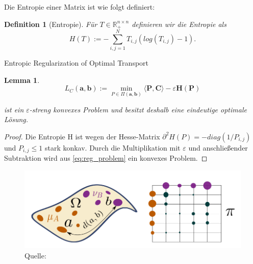 \documentclass[11pt,a4paper]{article}
\newcommand{\source}[1]{\caption*{\hfill Quelle: {#1}} }
\newtheorem{lemma}[theorem]{Lemma}
\newtheorem{definition}[theorem]{Definition}
\numberwithin{equation}{section}
\begin{document}
	Die Entropie einer Matrix ist wie folgt definiert:
	
	\begin{definition}[Entropie]
		Für $T \in \mathbb{R}_{+}^{n \times n}$ definieren wir die Entropie als
		\begin{equation}
		H(T) := - \sum_{i,j=1}^N{T_{i,j}(log(T_{i,j})-1)}.
		\end{equation}
	\end{definition}
	Entropic Regularization of Optimal Transport \cite{computationalOT}
	

	\begin{lemma}
		\begin{equation}
		L_C(\boldsymbol{a}, \boldsymbol{b}):= \min_{P \in \Pi(\boldsymbol{a}, \boldsymbol{b})}{\langle \boldsymbol{P}, \boldsymbol{C} \rangle - \varepsilon \boldsymbol{H}(\boldsymbol{P})}\label{eq:reg_problem}	
		\end{equation}
		
		
		ist ein $\varepsilon$-streng konvexes Problem und besitzt deshalb eine eindeutige optimale Lösung.
		
	\end{lemma}
	
	\begin{proof}
		Die Entropie H ist wegen der Hesse-Matrix $\partial ^2 H (P) = -diag(1/P_{i,j})$ und $P_{i,j} \leq 1$ stark konkav.
		Durch die Multiplikation mit $\varepsilon$ und anschließender Subtraktion wird aus \autoref{eq:reg_problem} ein konvexes Problem. 
	\end{proof}
	
	\begin{figure}[!ht]
		\centering
		\includegraphics[width=0.3\textheight]{wd_Transportplan.png}
		\caption[Visualisierung der Wasserstein-Distanz und Transportplan]{\textbf{Links:} Visualisierung der Wasserstein-Distanz zwischen den Verteilungen $\mu_A$ und $\nu_B$ auf dem metrischen Raum $(\Omega,d)$. \textbf{Rechts:} Möglicher Transportplan $\pi$.}
		\source{\cite{vialard2019elementary}}
		\label{im:wasserstein_distance_visualization}
	\end{figure}
	
\end{document}
